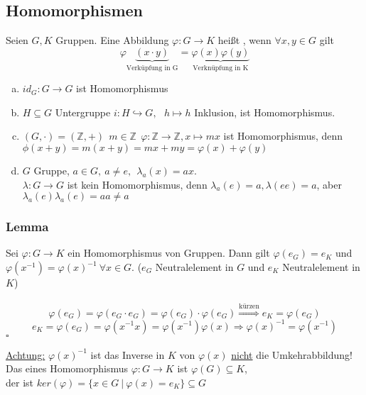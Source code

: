 \subsection{Homomorphismen}
\label{sub:homomorphismen}
Seien $G,K$ Gruppen. Eine Abbildung $\varphi: G \to K$ heißt , wenn $\forall x,y \in G$ gilt
\[\varphi\underbrace{(x\cdot y)}_{\text{Verküpfung in G} } =\underbrace{\varphi(x)\varphi(y)}_{\text{Verknüpfung in K}} \]

\begin{enumerate}[(a)]
	\item $id_G: G \to G$ ist Homomorphismus
	\item $H \subseteq G$ Untergruppe   $i:H \hookrightarrow G,~~~h \mapsto h$ Inklusion, ist Homomorphismus.
	\item $(G,\cdot)=(\mathds{Z},+)~~m\in \mathds{Z} ~~ \varphi:\mathds{Z} \to \mathds{Z}, x\mapsto mx$ ist Homomorphismus, denn $\phi(x+y)=m(x+y)=mx+my=\varphi(x)+\varphi(y)$
	\item $G$ Gruppe, $a \in G,~ a\not= e,~~ \lambda_a(x)=ax$.\\
	$\lambda: G \to G$ ist kein Homomorphismus, denn $\lambda_a(e)=a, \lambda(ee)=a$, aber $\lambda_a(e)\lambda_a(e)=aa\not=a$
\end{enumerate}

\subsubsection*{Lemma}
Sei $\varphi:G \to K$ ein Homomorphismus von Gruppen. Dann gilt $\varphi(e_G)=e_K$ und $\varphi(x^{-1})=\varphi(x)^{-1}~\forall x \in G$. ($e_G$ Neutralelement in $G$ und $e_K$ Neutralelement in $K$)\\
\\
\[
	\varphi(e_G)=\varphi(e_G \cdot e_G)=\varphi(e_G) \cdot \varphi(e_G)
	\stackrel{\text{kürzen}}{\Rightarrow} e_K=\varphi(e_G)
\]
\[
	e_K=\varphi(e_G)=\varphi(x^{-1}x)=\varphi(x^{-1})\varphi(x) \Rightarrow \varphi(x)^{-1}=\varphi(x^{-1})
\]
\hfill $\square$

\uline{Achtung:} $\varphi(x)^{-1}$ ist das Inverse in $K$ von $\varphi(x)$ \uline{nicht} die Umkehrabbildung!\\

Das  eines Homomorphismus $\varphi:G \to K$ ist $\varphi(G)\subseteq K$,\\
der  ist $ker(\varphi)=\{x \in G~|~\varphi(x)=e_K \}\subseteq G$

